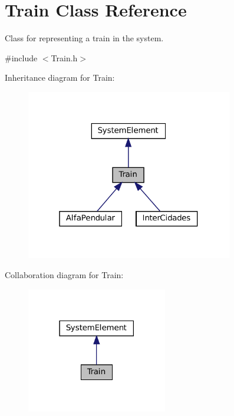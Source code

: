 \hypertarget{classTrain}{}\section{Train Class Reference}
\label{classTrain}


Class for representing a train in the system.  




{\ttfamily \#include $<$Train.\+h$>$}



Inheritance diagram for Train\+:
\nopagebreak
\begin{figure}[H]
\begin{center}
\leavevmode
\includegraphics[width=256pt]{classTrain__inherit__graph}
\end{center}
\end{figure}


Collaboration diagram for Train\+:
\nopagebreak
\begin{figure}[H]
\begin{center}
\leavevmode
\includegraphics[width=174pt]{classTrain__coll__graph}
\end{center}
\end{figure}
